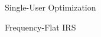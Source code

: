 \documentclass{IEEEtran}
\begin{document}
\begin{section}{Single-User Optimization}
\begin{subsection}{Frequency-Flat IRS}


\end{subsection}
\end{section}
\end{document}

